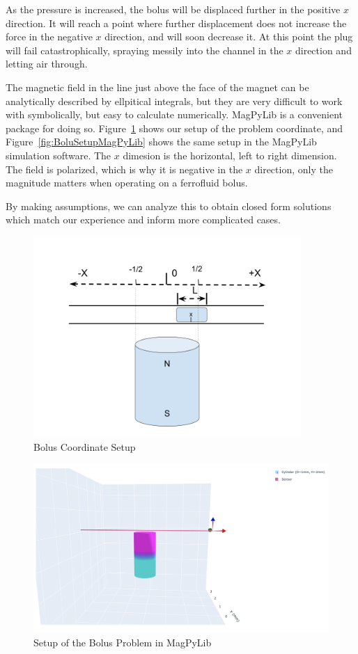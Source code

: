 \documentclass[]{asme2ej}
\begin{document}
As the pressure is increased, the bolus will be displaced further
in the positive $x$ direction.
It will reach a point where further displacement does not increase
the force in the negative $x$ direction, and will soon decrease it.
At this point the plug will fail
catastrophically, spraying messily into the channel in the $x$ direction and letting air through.

The magnetic field in the line just above the face of the magnet can be analytically
described by ellpitical integrals, but they are very difficult to work with symbolically,
but easy to calculate numerically.
MagPyLib is a convenient package for doing so.
Figure~\ref{fig:BolusSetup} shows our setup of the problem coordinate,
and Figure~\ref{fig:BoluSetupMagPyLib} shows the same setup in the MagPyLib simulation software.
The $x$ dimesion is the horizontal, left to right dimension.
The field is polarized, which is why it is negative in the $x$ direction, only
the magnitude matters when
operating on a ferrofluid bolus.

By making assumptions, we can
analyze this to obtain closed form solutions which match our
experience and inform more complicated cases.

\begin{figure}[h]
\centerline{\includegraphics[width=4in]{figure/BolusSetup.png}}
\caption{Bolus Coordinate Setup}
\label{fig:BolusSetup}
\end{figure}


\begin{figure}[h]
\centerline{\includegraphics[width=6in]{figure/SetupBolusProblem.png}}
\caption{Setup of the Bolus Problem in MagPyLib}
\label{fig:BolusSetupMagPyLib}
\end{figure}
\end{document}
